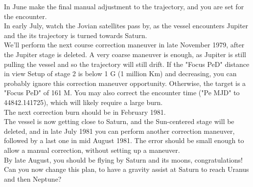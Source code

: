 \documentclass[Orbiter User Manual.tex]{subfiles}
\begin{document}
In June make the final manual adjustment to the trajectory, and you are set for the encounter.\\
In early July, watch the Jovian satellites pass by, as the vessel encounters Jupiter and the its trajectory is turned towards Saturn.\\
We'll perform the next course correction maneuver in late November 1979, after the Jupiter stage is deleted. A very coarse maneuver is enough, as Jupiter is still pulling the vessel and so the trajectory will still drift. If the "Focus PeD" distance in view Setup of stage 2 is below 1 G (1 million Km) and decreasing, you can probably ignore this correction maneuver opportunity. Otherwise, the target is a "Focus PeD" of 161 M. You may also correct the encounter time ("Pe MJD" to 44842.141725), which will likely require a large burn.\\
The next correction burn should be in February 1981.\\
The vessel is now getting close to Saturn, and the Sun-centered stage will be deleted, and in late July 1981 you can perform another correction maneuver, followed by a last one in mid August 1981. The error should be small enough to allow a manual correction, without setting up a maneuver.\\
By late August, you should be flying by Saturn and its moons, congratulations!\\
Can you now change this plan, to have a gravity assist at Saturn to reach Uranus and then Neptune?
\end{document}
